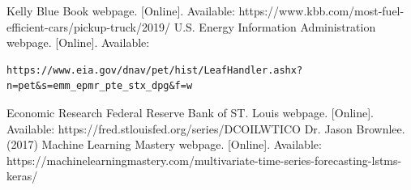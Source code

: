 \documentclass[conference]{IEEEtran}
\begin{document}
\begin{thebibliography}{00}
 Kelly Blue Book webpage. [Online]. Available: https://www.kbb.com/most-fuel-efficient-cars/pickup-truck/2019/
 U.S. Energy Information Administration webpage. [Online]. Available: \begin{verbatim}https://www.eia.gov/dnav/pet/hist/LeafHandler.ashx?n=pet&s=emm_epmr_pte_stx_dpg&f=w \end{verbatim}
 Economic Research Federal Reserve Bank of ST. Louis webpage. [Online]. Available: https://fred.stlouisfed.org/series/DCOILWTICO 
 Dr. Jason Brownlee. (2017) Machine Learning Mastery webpage. [Online]. Available: https://machinelearningmastery.com/multivariate-time-series-forecasting-lstms-keras/
\end{thebibliography}
\vspace{12pt}
\end{document}
